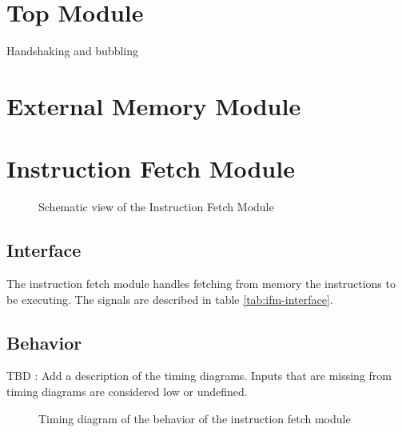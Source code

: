 \newpage

\section{Top Module}

\begin{content}
  Handshaking and bubbling
\end{content}

\newpage

\section{External Memory Module}
\newpage

\section{Instruction Fetch Module}

\begin{figure}[h!]
    \centering
    
    \caption{Schematic view of the Instruction Fetch Module}
    \label{fig:regm}
\end{figure}

\subsection{Interface}

\begin{content}
The instruction fetch module handles fetching from memory the instructions to be executing. The signals are described in table \ref{tab:ifm-interface}. 
\end{content}



\subsection{Behavior}

\begin{content}
  TBD : Add a description of the timing diagrams. Inputs that are missing from timing diagrams are considered low or undefined.
\end{content}

\begin{figure}[H]
    \centering
    
    \caption{Timing diagram of the behavior of the instruction fetch module}
    \label{fig:ifm-behavior-normal}
\end{figure}

